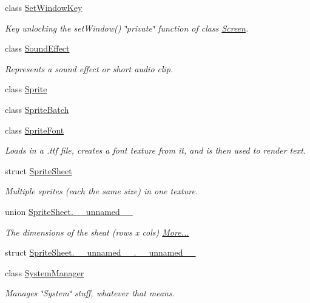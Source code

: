 \begin{DoxyCompactItemize}
class \hyperlink{classnta_1_1SetWindowKey}{Set\+Window\+Key}
\begin{DoxyCompactList}\small\item\em Key unlocking the set\+Window() \char`\"{}private\char`\"{} function of class \hyperlink{classnta_1_1Screen}{Screen}. \end{DoxyCompactList}\item 
class \hyperlink{classnta_1_1SoundEffect}{Sound\+Effect}
\begin{DoxyCompactList}\small\item\em Represents a sound effect or short audio clip. \end{DoxyCompactList}\item 
class \hyperlink{classnta_1_1Sprite}{Sprite}
\item 
class \hyperlink{classnta_1_1SpriteBatch}{Sprite\+Batch}
\item 
class \hyperlink{classnta_1_1SpriteFont}{Sprite\+Font}
\begin{DoxyCompactList}\small\item\em Loads in a .ttf file, creates a font texture from it, and is then used to render text. \end{DoxyCompactList}\item 
struct \hyperlink{structnta_1_1SpriteSheet}{Sprite\+Sheet}
\begin{DoxyCompactList}\small\item\em Multiple sprites (each the same size) in one texture. \end{DoxyCompactList}\item 
union \hyperlink{namespacenta_d1/d70/unionnta_1_1SpriteSheet_8____unnamed____}{Sprite\+Sheet.\+\_\+\+\_\+unnamed\+\_\+\+\_\+}
\begin{DoxyCompactList}\small\item\em The dimensions of the sheat (rows x cols)  \hyperlink{namespacenta_d1/d70/unionnta_1_1SpriteSheet_8____unnamed____}{More...}\end{DoxyCompactList}\item 
struct \hyperlink{namespacenta_df/d10/structnta_1_1SpriteSheet_8____unnamed_____8____unnamed____}{Sprite\+Sheet.\+\_\+\+\_\+unnamed\+\_\+\+\_\+.\+\_\+\+\_\+unnamed\+\_\+\+\_\+}
\item 
class \hyperlink{classnta_1_1SystemManager}{System\+Manager}
\begin{DoxyCompactList}\small\item\em Manages \char`\"{}\+System\char`\"{} stuff, whatever that means. \end{DoxyCompactList}\item 

\end{DoxyCompactItemize}

